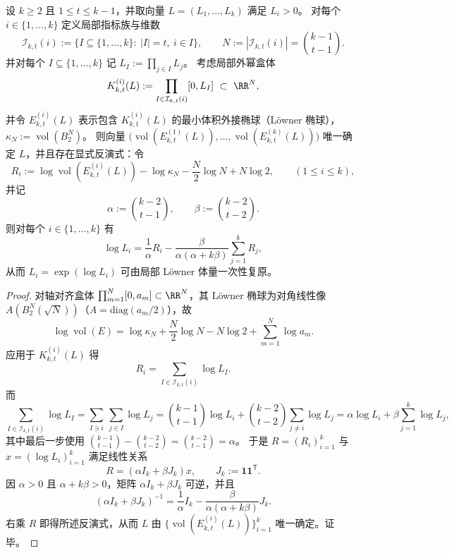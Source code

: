 \begin{theorem}\label{thm:xi-local-exterior-box-loewner-tomography-inversion}
设 \(k\ge 2\) 且 \(1\le t\le k-1\)，并取向量 \(L=(L_1,\dots,L_k)\) 满足 \(L_i>0\)。
对每个 \(i\in\{1,\dots,k\}\) 定义局部指标族与维数
\[
\mathcal I_{k,t}(i):=\{I\subseteq\{1,\dots,k\}:\ |I|=t,\ i\in I\},
\qquad
N:=|\mathcal I_{k,t}(i)|=\binom{k-1}{t-1}.
\]
并对每个 \(I\subseteq\{1,\dots,k\}\) 记 \(L_I:=\prod_{j\in I}L_j\)。
考虑局部外幂盒体
\[
K_{k,t}^{(i)}(L):=\prod_{I\in \mathcal I_{k,t}(i)}[0,L_I]\ \subset\ \RR^{N},
\]
并令 \(E_{k,t}^{(i)}(L)\) 表示包含 \(K_{k,t}^{(i)}(L)\) 的最小体积外接椭球（Löwner 椭球），\(\kappa_N:=\operatorname{vol}(B_2^N)\)。
则向量
\(
\bigl(\operatorname{vol}(E_{k,t}^{(1)}(L)),\dots,\operatorname{vol}(E_{k,t}^{(k)}(L))\bigr)
\)
唯一确定 \(L\)，并且存在显式反演式：令
\[
R_i:=\log\operatorname{vol}(E_{k,t}^{(i)}(L))-\log\kappa_N-\frac{N}{2}\log N+N\log 2,
\qquad (1\le i\le k),
\]
并记
\[
\alpha:=\binom{k-2}{t-1},
\qquad
\beta:=\binom{k-2}{t-2}.
\]
则对每个 \(i\in\{1,\dots,k\}\) 有
\[
\log L_i
=\frac{1}{\alpha}R_i-\frac{\beta}{\alpha(\alpha+k\beta)}\sum_{j=1}^k R_j,
\]
从而 \(L_i=\exp(\log L_i)\) 可由局部 Löwner 体量一次性复原。
\end{theorem}
\begin{proof}
对轴对齐盒体 \(\prod_{m=1}^{N}[0,a_m]\subset\RR^N\)，其 Löwner 椭球为对角线性像 \(A(B_2^N(\sqrt N))\)（\(A=\mathrm{diag}(a_m/2)\)），故
\[
\log\operatorname{vol}(E)
=\log\kappa_N+\frac N2\log N-N\log2+\sum_{m=1}^{N}\log a_m.
\]
应用于 \(K_{k,t}^{(i)}(L)\) 得
\[
R_i=\sum_{I\in\mathcal I_{k,t}(i)}\log L_I.
\]
而
\[
\sum_{I\in\mathcal I_{k,t}(i)}\log L_I
=\sum_{I\ni i}\ \sum_{j\in I}\log L_j
=\binom{k-1}{t-1}\log L_i+\binom{k-2}{t-2}\sum_{j\ne i}\log L_j
=\alpha\log L_i+\beta\sum_{j=1}^k\log L_j,
\]
其中最后一步使用
\(
\binom{k-1}{t-1}-\binom{k-2}{t-2}=\binom{k-2}{t-1}=\alpha
\)。
于是 \(R=(R_i)_{i=1}^k\) 与 \(x=(\log L_i)_{i=1}^k\) 满足线性关系
\[
R=(\alpha I_k+\beta J_k)x,
\qquad
J_k:=\mathbf 1\mathbf 1^{\mathsf T}.
\]
因 \(\alpha>0\) 且 \(\alpha+k\beta>0\)，矩阵 \(\alpha I_k+\beta J_k\) 可逆，并且
\[
(\alpha I_k+\beta J_k)^{-1}
=\frac{1}{\alpha}I_k-\frac{\beta}{\alpha(\alpha+k\beta)}J_k.
\]
右乘 \(R\) 即得所述反演式，从而 \(L\) 由 \(\{\operatorname{vol}(E_{k,t}^{(i)}(L))\}_{i=1}^k\) 唯一确定。证毕。
\end{proof}

